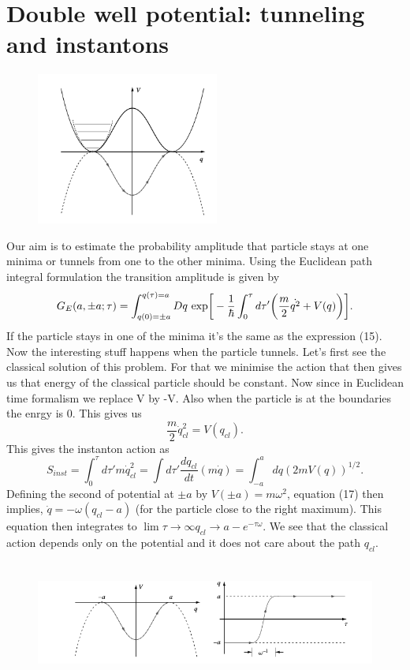 \documentclass[a4paper, 12pt]{article}
\begin{document}
\section {Double well potential: tunneling and instantons}
\begin{figure}[ht]
    \centering
    \includegraphics[height=5cm, width=6cm]{fig1}
\end{figure}

Our aim is to estimate the probability amplitude that particle stays at one minima or tunnels from one to the other minima. Using the Euclidean path integral formulation the transition amplitude is given by
\begin{equation}%
G_E(a,\pm a;\tau)=  \int_{q(0)=\pm a}^{q(\tau)=a} Dq \*\ \textrm{exp}\bigg[-\frac{1}{\hbar}\int_0^\tau d\tau' \bigg(\frac{m}{2}\dot{q^2} + V(q) \bigg) \bigg].
\end{equation}
If the particle stays in one of the minima it's the same as the expression (15). Now the interesting stuff happens when the particle tunnels. Let's first see the classical solution of this problem. For that we minimise the action that then gives us that energy of the classical particle should be constant. Now since in Euclidean time formalism we replace V by -V. Also when the particle is at the boundaries the enrgy is 0. This gives us
\begin{equation}
\frac{m}{2}\dot{q}^2_{cl}=V(q_{cl}).
\end{equation}
This gives the instanton action as
\begin{equation}
S_{inst} = \int_0^{\tau} d\tau ' m\dot{q}^2_{cl} = \int  d\tau ' \frac{dq_{cl}}{dt}(m\dot{q}) = \int_{-a}^{a} dq (2mV(q))^{1/2}.
\end{equation}
Defining the second of potential at $\pm a$ by $V(\pm a)=m\omega^2$, equation (17) then implies, $\dot{q}= -\omega(q_{cl}-a)$ (for the particle close to the right maximum). This equation then integrates to $\lim{\tau \to \infty} q_{cl} \to a - e^{-\tau \omega}$. We see that the classical action depends only on the potential and it does not care about the path $q_{cl}$.\\
\begin{figure}[ht]
    \centering
    \includegraphics[height=4cm, width=15cm]{fig2}
\end{figure}
\end{document}
